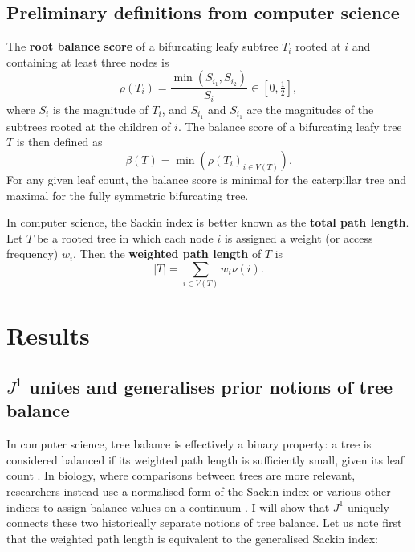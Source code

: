 \subsection{Preliminary definitions from computer science}\label{compscisec}

\begin{definition}
    The \textbf{root balance score} of a bifurcating leafy subtree $T_i$ rooted
    at $i$ and containing at least three nodes is
    \begin{equation}
        \rho(T_i) = \frac{\min(S_{i_1}, S_{i_2})}{S_i} \in \left[0, \tfrac{1}{2}\right],
    \end{equation}
    where $S_i$ is the magnitude of $T_i$, and $S_{i_1}$ and $S_{i_1}$ are the
    magnitudes of the subtrees rooted at the children of $i$. The balance score
    of a bifurcating leafy tree $T$ is then defined as
    \begin{equation}\label{defballeafy}
        \beta(T) = \min\left( \rho(T_i)_{i\in V(T)} \right).
    \end{equation}
    For any given leaf count, the balance score is minimal for the caterpillar
    tree and maximal for the fully symmetric bifurcating tree.
\end{definition}

\begin{definition}
    In computer science, the Sackin index is better known as the \textbf{total path length}.
    Let $T$ be a rooted tree in which each node $i$ is assigned a weight
    (or access frequency) $w_i$. Then the \textbf{weighted path length} of $T$ is
    \begin{equation}\label{wpathdef}
        |T| = \sum_{i \in V(T)} w_i \nu(i).
    \end{equation}
\end{definition}


\section{Results}


\subsection{$J^1$ unites and generalises prior notions of tree balance}

In computer science, tree balance is effectively a binary property: a tree is
considered balanced if its weighted path length is sufficiently small, given its
leaf count \citep{nievergelt_binary_1972}. In biology, where comparisons between
trees are more relevant, researchers instead use a normalised form of the Sackin
index or various other indices to assign balance values on a continuum
\citep{colless_review_1982, shao_tree_1990, mir_new_2013, mir_sound_2018, fischer_tree_2021}.
I will show that $J^1$ uniquely connects these two historically separate
notions of tree balance.
Let us note first that the weighted path length is equivalent to the generalised Sackin index:

